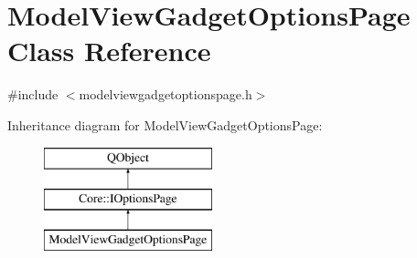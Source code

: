 \hypertarget{class_model_view_gadget_options_page}{\section{Model\-View\-Gadget\-Options\-Page Class Reference}
\label{class_model_view_gadget_options_page}
}


{\ttfamily \#include $<$modelviewgadgetoptionspage.\-h$>$}

Inheritance diagram for Model\-View\-Gadget\-Options\-Page\-:\begin{figure}[H]
\begin{center}
\leavevmode
\includegraphics[height=3.000000cm]{class_model_view_gadget_options_page}
\end{center}
\end{figure}
